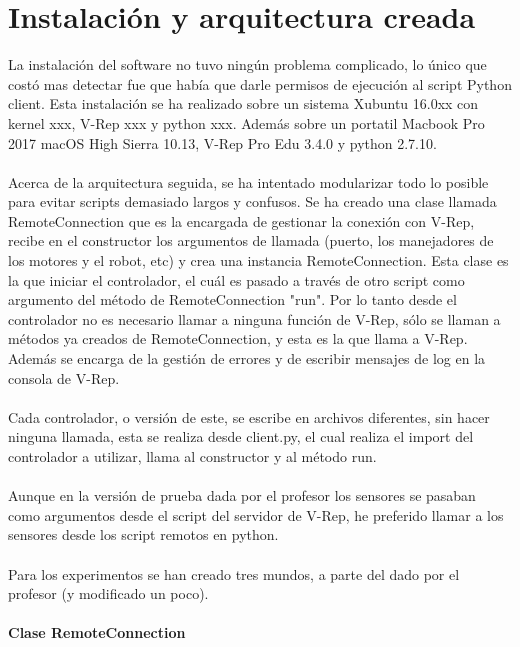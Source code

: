 \documentclass[14pt]{extarticle}
\theoremstyle{definition}
\theoremstyle{remark}
\begin{document}
\section{Instalación y arquitectura creada}\label{sec:instalacionyarquitecturacreada}
La instalación del software no tuvo ningún problema complicado, lo único que costó mas detectar fue que había que darle permisos de ejecución al script Python client. Esta instalación se ha realizado sobre un sistema Xubuntu 16.0xx con kernel xxx, V-Rep xxx y python xxx. Además sobre un portatil Macbook Pro 2017 macOS High Sierra 10.13, V-Rep  Pro Edu 3.4.0 y python 2.7.10.\\\\
Acerca de la arquitectura seguida, se ha intentado modularizar todo lo posible para evitar scripts demasiado largos y confusos. Se ha creado una clase llamada RemoteConnection que es la encargada de gestionar la conexión con V-Rep, recibe en el constructor los argumentos de llamada (puerto, los manejadores de los motores y el robot, etc) y crea una instancia RemoteConnection. Esta clase es la que iniciar el controlador, el cuál es pasado a través de otro script como argumento del método de RemoteConnection "run". Por lo tanto desde el controlador no es necesario llamar a ninguna función de V-Rep, sólo se llaman a métodos ya creados de RemoteConnection, y esta es la que llama a V-Rep. Además se encarga de la gestión de errores y de escribir mensajes de log en la consola de V-Rep.\\\\
Cada controlador, o versión de este, se escribe en archivos diferentes, sin hacer ninguna llamada, esta se realiza desde client.py, el cual realiza el import del controlador a utilizar, llama al constructor y al método run.\\\\
Aunque en la versión de prueba dada por el profesor los sensores se pasaban como argumentos desde el script del servidor de V-Rep, he preferido llamar a los sensores desde los script remotos en python.\\\\
Para los experimentos se han creado tres mundos, a parte del dado por el profesor (y modificado un poco).\\\\
\newpage
\textbf{Clase RemoteConnection}\\\\
\end{document}
